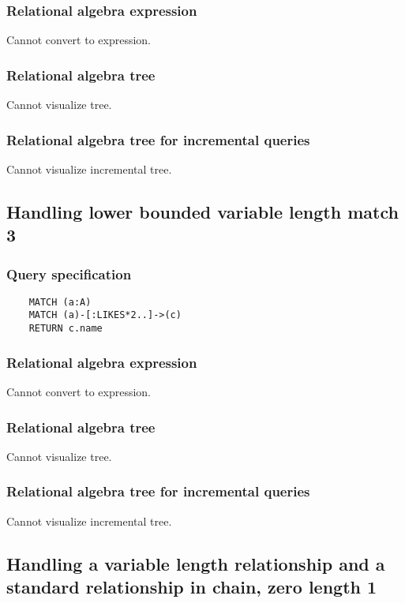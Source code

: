 	\subsubsection*{Relational algebra expression}

	Cannot convert to expression.

	\subsubsection*{Relational algebra tree}

	Cannot visualize tree.

	\subsubsection*{Relational algebra tree for incremental queries}

	Cannot visualize incremental tree.
	\subsection{Handling lower bounded variable length match 3}

	\subsubsection*{Query specification}

	\begin{lstlisting}
	MATCH (a:A)
	MATCH (a)-[:LIKES*2..]->(c)
	RETURN c.name
	\end{lstlisting}


	\subsubsection*{Relational algebra expression}

	Cannot convert to expression.

	\subsubsection*{Relational algebra tree}

	Cannot visualize tree.

	\subsubsection*{Relational algebra tree for incremental queries}

	Cannot visualize incremental tree.
	\subsection{Handling a variable length relationship and a standard relationship in chain, zero length 1}

